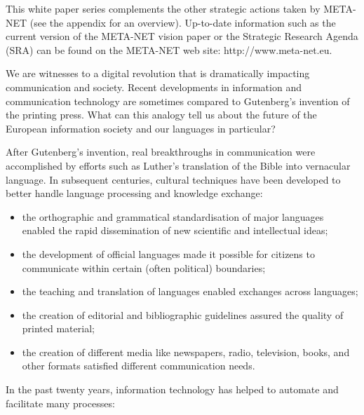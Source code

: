 \begin{multicols}{2}
This white paper series complements the other strategic actions taken by META-NET (see the appendix for an overview). Up-to-date information such as the current version of the META-NET vision paper \cite{Meta1} or the Strategic Research Agenda (SRA) can be found on the META-NET web site: http://www.meta-net.eu.
\end{multicols}

\clearpage


\begin{multicols}{2}

We are witnesses to a digital revolution that is dramatically impacting communication and society. Recent developments in information and communication technology are sometimes compared to Gutenberg’s invention of the printing press. What can this analogy tell us about the future of the European information society and our languages in particular?


After Gutenberg’s invention, real breakthroughs in communication were accomplished by efforts such as Luther’s translation of the Bible into vernacular language. In subsequent centuries, cultural techniques have been developed to better handle language processing and knowledge exchange:

\begin{itemize}
\item the orthographic and grammatical standardisation of major languages enabled the rapid dissemination of new scientific and intellectual ideas;
\item the development of official languages made it possible for citizens to communicate within certain (often political) boundaries;
\item the teaching and translation of languages enabled exchanges across languages;
\item the creation of editorial and bibliographic guidelines assured the quality of printed material;
\item the creation of different media like newspapers, radio, television, books, and other formats satisfied different communication needs. 
\end{itemize}

In the past twenty years, information technology has helped to automate and facilitate many processes:


\end{multicols}
